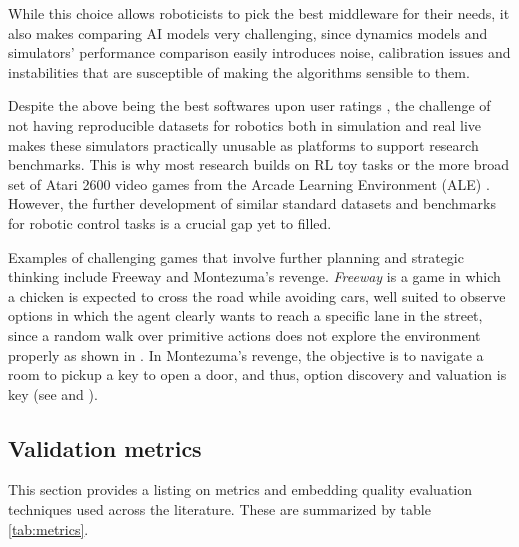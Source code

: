 \documentclass[a4paper]{article}
\begin{document}
While this choice allows roboticists to pick the best middleware for their needs, it also makes comparing AI models very challenging, since dynamics models and simulators' performance comparison easily introduces noise, calibration issues and instabilities that are susceptible of making the algorithms sensible to them.

Despite the above being the best softwares upon user ratings \cite{Ivaldi14}, the challenge of not having reproducible datasets for robotics both in simulation and real live makes these simulators practically unusable as platforms to support research benchmarks. This is why most research builds on RL toy tasks or the more broad set of Atari 2600 video games from the Arcade Learning Environment (ALE) \cite{Bellemare13,Machado17}. However, the further development of similar standard datasets and benchmarks for robotic control tasks is a crucial gap yet to filled.

Examples of challenging games that involve further planning and strategic thinking include Freeway and Montezuma's revenge. \textit{Freeway} is a game in which a chicken is expected to cross the road while avoiding cars, well suited to observe options in which the agent clearly wants to reach a specific lane in the street, %
since a random walk over primitive actions does not explore the environment properly as shown in \cite{Machado17a}. %
In Montezuma's revenge, the objective is to navigate a room to pickup a key to open a door, and thus, option discovery and valuation is key (see \cite{Kulkarni16} and \cite{Machado17a}).



\subsection{Validation metrics}
This section provides a listing on metrics and embedding quality evaluation techniques used across the literature. These are summarized by table \ref{tab:metrics}.
\end{document}
